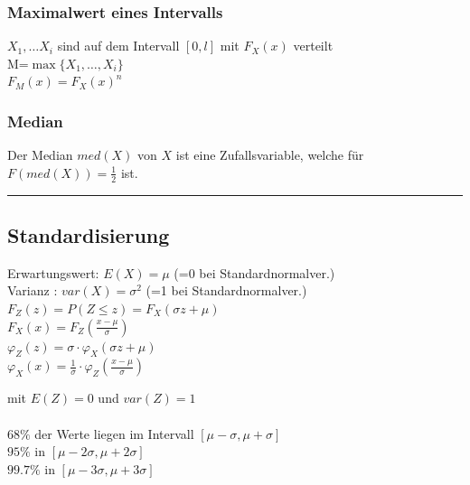     \begin{multicols}{2}    
      \subsubsection{Maximalwert eines Intervalls}
        $X_1,\ldots X_i$ sind auf dem Intervall $[0,l]$ mit $F_X(x)$ verteilt\\
        M=$\max \{ X_1,\ldots,X_i\} $ \\
        $F_M(x)=F_X(x)^n$ \\
    \columnbreak
      \subsubsection{Median \skript{\pageref{sk-subsubsection-median}}}
        Der Median $med(X)$ von $X$ ist eine Zufallsvariable, welche für
        $F(med(X)) = \frac{1}{2}$ ist.
      
    \end{multicols}

\hrule

  \subsection{Standardisierung \skript{\pageref{sk-satz-standardisierung}}}
    \begin{multicols}{2}
      Erwartungswert: $E(X)=\mu$ \hspace{4mm}(=0 bei Standardnormalver.)\\ 
      Varianz \hspace{11.5mm}: $var(X)=\sigma^2$ (=1 bei Standardnormalver.)\\

      $F_Z(z) = P(Z \leq z) = F_X(\sigma z + \mu)$ \\
      $F_X(x) = F_Z(\frac{x-\mu}{\sigma})$\\
      $\varphi_Z(z) = \sigma \cdot \varphi_X(\sigma z + \mu)$\\
      $\varphi_X(x) = \frac{1}{\sigma} \cdot \varphi_Z(\frac{x - \mu}{\sigma})$ \\
      
    \columnbreak
    
       \hspace{5mm} mit $E(Z) = 0$ und $var(Z) = 1$\\ \\
      
      $68\% $ der Werte liegen im Intervall $[ \mu - \sigma, \mu + \sigma]$ \\ 
      $95\% $ in $[ \mu - 2\sigma, \mu + 2\sigma]$ \\
      $99.7\% $ in $[ \mu - 3\sigma, \mu + 3\sigma]$ \\
    
    \end{multicols}


